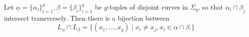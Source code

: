 

    Let $\underline \alpha = \{\alpha_i\}_{i=1}^g, \underline \beta = \{\beta_i\}_{i=1}^g$ be $g$-tuples of disjoint curves in $\Sigma_g$, so that $\alpha_i\cap \beta_j$ intersect transversely. Then there is a bijection between
    \[L_{\underline \alpha}\cap L_{\underline \beta} = \{(x_1, \ldots, x_g)\;|\; x_i\neq x_j, x_i \in \underline \alpha \cap \underline \beta.\}\]
